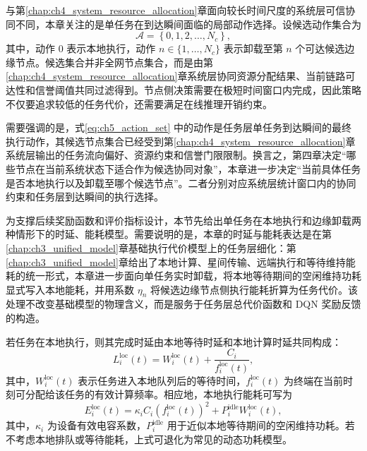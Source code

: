 与第\ref{chap:ch4_system_resource_allocation}章面向较长时间尺度的系统层可信协同不同，本章关注的是{单任务在到达瞬间面临的局部动作选择}。设候选动作集合为
\begin{equation}
    \mathcal{A} = \left\{0,1,2,\ldots,N_c\right\},
    \label{eq:ch5_action_set}
\end{equation}
其中，动作 $0$ 表示本地执行，动作 $n \in \{1,\ldots,N_c\}$ 表示卸载至第 $n$ 个可达候选边缘节点。候选集合并非全网节点集合，而是由第\ref{chap:ch4_system_resource_allocation}章系统层协同资源分配结果、当前链路可达性和信誉阈值共同过滤得到。节点侧决策需要在极短时间窗口内完成，因此策略不仅要追求较低的任务代价，还需要满足在线推理开销约束。

需要强调的是，式\eqref{eq:ch5_action_set} 中的动作是任务层单任务到达瞬间的最终执行动作，其候选节点集合已经受到第\ref{chap:ch4_system_resource_allocation}章系统层输出的任务流向偏好、资源约束和信誉门限限制。换言之，第四章决定“哪些节点在当前系统状态下适合作为候选协同对象”，本章进一步决定“当前具体任务是否本地执行以及卸载至哪个候选节点”。二者分别对应系统层统计窗口内的协同约束和任务层到达瞬间的执行选择。

为支撑后续奖励函数和评价指标设计，本节先给出单任务在本地执行和边缘卸载两种情形下的时延、能耗模型。需要说明的是，本章的时延与能耗表达是在第\ref{chap:ch3_unified_model}章基础执行代价模型上的任务层细化：第\ref{chap:ch3_unified_model}章给出了本地计算、星间传输、远端执行和等待维持能耗的统一形式，本章进一步面向单任务实时卸载，将本地等待期间的空闲维持功耗显式写入本地能耗，并用系数 $\eta_n$ 将候选边缘节点侧执行能耗折算为任务代价。该处理不改变基础模型的物理含义，而是服务于任务层总代价函数和 DQN 奖励反馈的构造。

若任务在本地执行，则其完成时延由本地等待时延和本地计算时延共同构成：
\begin{equation}
    L_i^{\mathrm{loc}}(t) = W_i^{\mathrm{loc}}(t) + \frac{C_i}{f_i^{\mathrm{loc}}(t)},
    \label{eq:ch5_local_delay}
\end{equation}
其中，$W_i^{\mathrm{loc}}(t)$ 表示任务进入本地队列后的等待时间，$f_i^{\mathrm{loc}}(t)$ 为终端在当前时刻可分配给该任务的有效计算频率。相应地，本地执行能耗可写为
\begin{equation}
    E_i^{\mathrm{loc}}(t) = \kappa_i C_i \left( f_i^{\mathrm{loc}}(t) \right)^2
    + P_i^{\mathrm{idle}} W_i^{\mathrm{loc}}(t),
    \label{eq:ch5_local_energy}
\end{equation}
其中，$\kappa_i$ 为设备有效电容系数，$P_i^{\mathrm{idle}}$ 用于近似本地等待期间的空闲维持功耗。若不考虑本地排队或等待能耗，上式可退化为常见的动态功耗模型。

